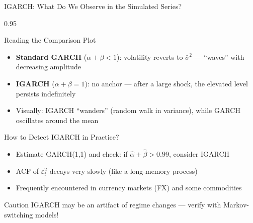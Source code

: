 \documentclass[9pt, aspectratio=169, t]{beamer}
\begin{document}
\begin{frame}{IGARCH: What Do We Observe in the Simulated Series?}
    \begin{cminipage}{0.95\textwidth}
    {\footnotesize
        \begin{block}{Reading the Comparison Plot}
            \begin{itemize}\setlength{\itemsep}{0pt}
                \item \textbf{Standard GARCH} ($\alpha + \beta < 1$): volatility reverts to $\bar{\sigma}^2$ --- ``waves'' with decreasing amplitude
                \item \textbf{IGARCH} ($\alpha + \beta = 1$): no anchor --- after a large shock, the elevated level persists indefinitely
                \item Visually: IGARCH ``wanders'' (random walk in variance), while GARCH oscillates around the mean
            \end{itemize}
        \end{block}
        \begin{exampleblock}{How to Detect IGARCH in Practice?}
            \begin{itemize}\setlength{\itemsep}{0pt}
                \item Estimate GARCH(1,1) and check: if $\hat{\alpha} + \hat{\beta} > 0.99$, consider IGARCH
                \item ACF of $\varepsilon_t^2$ decays very slowly (like a long-memory process)
                \item Frequently encountered in currency markets (FX) and some commodities
            \end{itemize}
        \end{exampleblock}
        \begin{alertblock}{Caution}
            IGARCH may be an artifact of regime changes --- verify with Markov-switching models!
        \end{alertblock}
    }
    \end{cminipage}
\end{frame}
\end{document}
